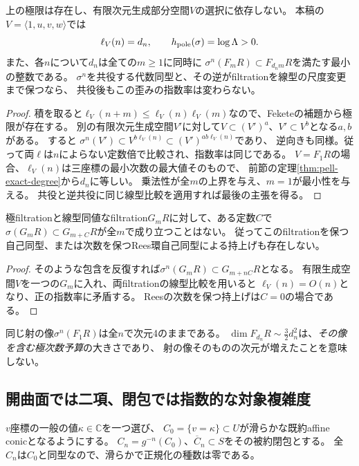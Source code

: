 \begin{theorem}[Pell成長のfilteredな検出]
\label{thm:filtered-pell-entropy}
上の極限は存在し、有限次元生成部分空間$V$の選択に依存しない。
本稿の$V=\langle1,u,v,w\rangle$では
\[
 \ell_V(n)=d_n,\qquad h_{\rm pole}(\sigma)=\log\Lambda>0.
\]
また、各$n$について$d_n$は全ての$m\ge1$に同時に
$\sigma^n(F_mR)\subset F_{d_nm}R$を満たす最小の整数である。
$\sigma^n$を共役する代数同型と、その逆がfiltrationを線型の尺度変更まで保つなら、
共役後もこの歪みの指数率は変わらない。
\end{theorem}
\begin{proof}
積を取ると$\ell_V(n+m)\le\ell_V(n)\ell_V(m)$なので、Feketeの補題から極限が存在する。
別の有限次元生成空間$V'$に対して$V\subset(V')^a$、$V'\subset V^b$となる$a,b$がある。
すると
$\sigma^n(V')\subset V^{b\ell_V(n)}\subset(V')^{ab\ell_V(n)}$であり、
逆向きも同様。従って両$\ell$は$n$によらない定数倍で比較され、指数率は同じである。
$V=F_1R$の場合、$\ell_V(n)$は三座標の最小次数の最大値そのもので、
前節の定理\ref{thm:pell-exact-degree}から$d_n$に等しい。
乗法性が全$m$の上界を与え、$m=1$が最小性を与える。
共役と逆共役に同じ線型比較を適用すれば最後の主張を得る。
\end{proof}

\begin{corollary}[一様な加法的shiftでは成長を吸収できない]
\label{cor:no-additive-filtered-lift}
極filtrationと線型同値なfiltration$G_mR$に対して、ある定数$C$で
$\sigma(G_mR)\subset G_{m+C}R$が全$m$で成り立つことはない。
従ってこのfiltrationを保つ自己同型、または次数を保つRees環自己同型による持上げも存在しない。
\end{corollary}
\begin{proof}
そのような包含を反復すれば$\sigma^n(G_mR)\subset G_{m+nC}R$となる。
有限生成空間$V$を一つの$G_m$に入れ、両filtrationの線型比較を用いると
$\ell_V(n)=O(n)$となり、正の指数率に矛盾する。
Reesの次数を保つ持上げは$C=0$の場合である。
\end{proof}

同じ射の像$\sigma^n(F_1R)$は全$n$で次元4のままである。
$\dim F_{d_n}R\sim\tfrac32d_n^2$は、\emph{その像を含む極次数予算}の大きさであり、
射の像そのものの次元が増えたことを意味しない。

\subsection{開曲面では二項、閉包では指数的な対象複雑度}
$v$座標の一般の値$\kappa\in\mathbb C$を一つ選び、
$C_0=\{v=\kappa\}\subset U$が滑らかな既約affine conicとなるようにする。
$C_n=g^{-n}(C_0)$、$\overline C_n\subset S$をその被約閉包とする。
全$C_n$は$C_0$と同型なので、滑らかで正規化の種数は零である。

